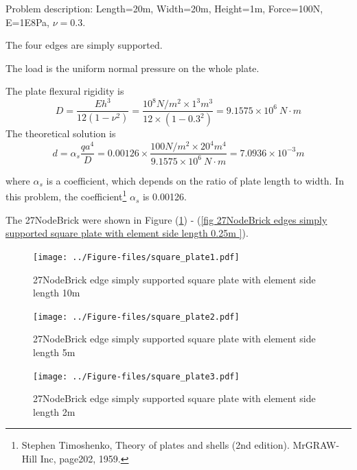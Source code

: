 \documentclass[fleqn,11pt]{article}
\begin{document}
Problem description: Length=20m, Width=20m, Height=1m, Force=100N, E=1E8Pa, $\nu=0.3$. 

The four edges are simply supported. 

The load is the uniform normal pressure on the whole plate. 

The plate flexural rigidity is 
\begin{equation}
  D=\frac{Eh^3}{12(1-\nu^2)}=\frac{10^8 N/m^2 \times 1^3 m^3 }{12 \times (1-0.3^2) }= 9.1575 \times 10^6 \ N\cdot m
\end{equation}
The theoretical solution is 
\begin{equation}
  d=\alpha_s \frac{q a^4}{D}=0.00126\times \frac{100 N/m^2 \times 20^4 m^4}{9.1575 \times 10^6 \ N\cdot m}=7.0936\times 10^{-3} m
\end{equation}

where $\alpha_s$ is a coefficient, which depends on the ratio of plate length to width. In this problem, the coefficient\footnote{Stephen Timoshenko, Theory of plates and shells (2nd edition). MrGRAW-Hill Inc, page202, 1959.} $\alpha_s$ is 0.00126.

The 27NodeBrick were shown in Figure (\ref{fig 27NodeBrick edges simply supported square plate with element side length 10m }) - (\ref{fig 27NodeBrick edges simply supported square plate with element side length 0.25m }). 



\begin{figure}[H]
  \centering
  \texttt{[image: ../Figure-files/square\_plate1.pdf]}
  \caption{27NodeBrick edge simply supported square plate with element side length 10m }
  \label{fig 27NodeBrick edges simply supported square plate with element side length 10m }
\end{figure}

\newpage

\begin{figure}[H]
  \centering
  \texttt{[image: ../Figure-files/square\_plate2.pdf]}
  \caption{27NodeBrick edge simply supported square plate with element side length 5m }
  \label{fig 27NodeBrick edges simply supported square plate with element side length 5m }
\end{figure}


\begin{figure}[H]
  \centering
  \texttt{[image: ../Figure-files/square\_plate3.pdf]}
  \caption{27NodeBrick edge simply supported square plate with element side length 2m }
  \label{fig 27NodeBrick edges simply supported square plate with element side length 2m }
\end{figure}
\end{document}
